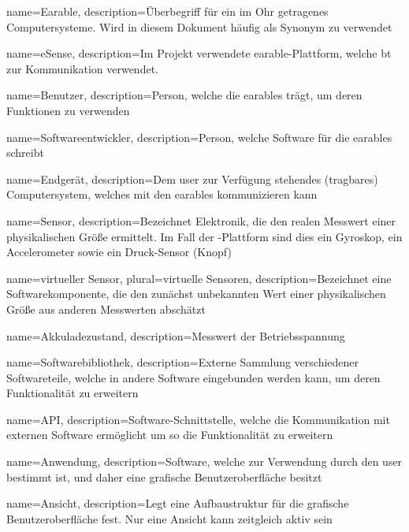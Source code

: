{
	name=Earable,
	description={Überbegriff für ein im Ohr getragenes Computersysteme. Wird in diesem Dokument häufig als Synonym zu  verwendet}
}

{
	name=eSense,
	description={Im Projekt verwendete \Gls{earable}-Plattform, welche \Gls{bt} zur Kommunikation verwendet. }
}

{
	name=Benutzer,
	description={Person, welche die \Gls{earable}s trägt, um deren Funktionen zu verwenden}
}

{
	name=Softwareentwickler,
	description={Person, welche Software für die \Gls{earable}s schreibt}
}

{
	name=Endgerät,
	description={Dem \Gls{user} zur Verfügung stehendes (tragbares) Computersystem, welches mit den \Gls{earable}s kommunizieren kann}
}

{
	name=Sensor,
	description={Bezeichnet Elektronik, die den realen Messwert einer physikalischen Größe ermittelt. Im Fall der -Plattform sind dies ein Gyroskop, ein Accelerometer sowie ein Druck-Sensor (Knopf)}
}

{
	name=virtueller Sensor,
	plural=virtuelle Sensoren,
	description={Bezeichnet eine Softwarekomponente, die den zunächst unbekannten Wert einer physikalischen Größe aus anderen Messwerten abschätzt}
}

{
	name=Akkuladezustand,
	description={Messwert der Betriebsspannung}
}

{
	name=Softwarebibliothek,
	description={Externe Sammlung verschiedener Softwareteile, welche in andere Software eingebunden werden kann, um deren Funktionalität zu erweitern}
}

{
	name=API,
	description={Software-Schnittstelle, welche die Kommunikation mit externen Software ermöglicht um so die Funktionalität zu erweitern}
}

{
	name=Anwendung,
	description={Software, welche zur Verwendung durch den \Gls{user} bestimmt ist, und daher eine grafische Benutzeroberfläche besitzt}
}

{
	name=Ansicht,
	description={Legt eine Aufbaustruktur für die grafische Benutzeroberfläche fest. Nur eine Ansicht kann zeitgleich aktiv sein}
}

